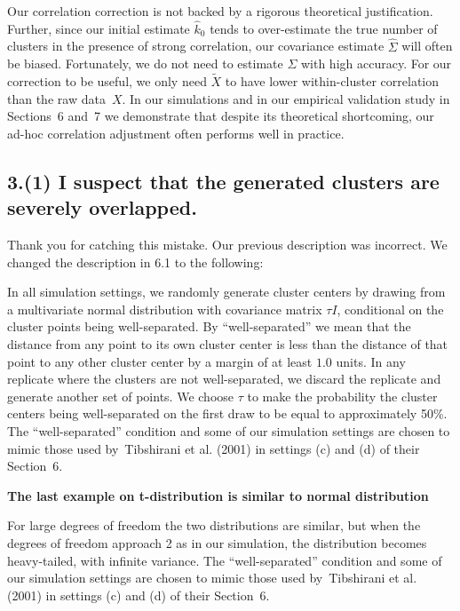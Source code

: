 \documentclass[11pt]{article}
\begin{document}
Our correlation correction is not backed by a rigorous theoretical
justification. Further, since our initial estimate $\hat k_0$ tends to
over-estimate the true number of clusters in the presence of strong
correlation, our covariance estimate $\hat \Sigma$ will often be biased.
Fortunately, we do not need to estimate $\Sigma$ with high accuracy. For our
correction to be useful, we only need $\tilde{X}$ to have lower within-cluster
correlation than the raw data~$X$. In our simulations and in our empirical
validation study in Sections~6 and~7 we demonstrate that despite its
theoretical shortcoming, our ad-hoc correlation adjustment often performs well
in practice.


\subsection{3.(1) I suspect that the generated clusters are severely overlapped.}

Thank you for catching this mistake. Our previous description was
incorrect. We changed the description in 6.1 to the following:

In all simulation settings, we randomly generate cluster centers by drawing
from a multivariate normal distribution with covariance matrix $\tau I$,
conditional on the cluster points being well-separated. By ``well-separated''
we mean that the distance from any point to its own cluster center is less
than the distance of that point to any other cluster center by a margin of at
least $1.0$ units. In any replicate where the clusters are not well-separated,
we discard the replicate and generate another set of points.  We choose $\tau$
to make the probability the cluster centers being well-separated on the first
draw to be equal to approximately 50\%.  The ``well-separated'' condition and
some of our simulation settings are chosen to mimic those used by~Tibshirani
et al. (2001) in settings (c) and (d) of their Section~6.



\textbf{The last example on t-distribution is similar to normal distribution}

For large degrees of freedom the two distributions are similar, but when the
degrees of freedom approach 2 as in our simulation, the distribution becomes
heavy-tailed, with infinite variance.  The ``well-separated'' condition and
some of our simulation settings are chosen to mimic those used by~Tibshirani
et al. (2001) in settings (c) and (d) of their Section~6.
\end{document}
